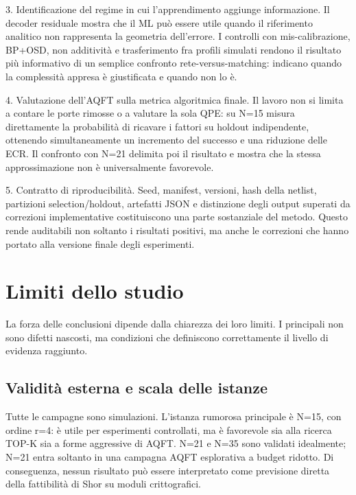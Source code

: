 3. Identificazione del regime in cui l'apprendimento aggiunge informazione. Il decoder residuale mostra che il ML può essere utile quando il riferimento analitico non rappresenta la geometria dell'errore. I controlli con mis-calibrazione, BP+OSD, non additività e trasferimento fra profili simulati rendono il risultato più informativo di un semplice confronto rete-versus-matching: indicano quando la complessità appresa è giustificata e quando non lo è.

4. Valutazione dell'AQFT sulla metrica algoritmica finale. Il lavoro non si limita a contare le porte rimosse o a valutare la sola QPE: su N=15 misura direttamente la probabilità di ricavare i fattori su holdout indipendente, ottenendo simultaneamente un incremento del successo e una riduzione delle ECR. Il confronto con N=21 delimita poi il risultato e mostra che la stessa approssimazione non è universalmente favorevole.

5. Contratto di riproducibilità. Seed, manifest, versioni, hash della netlist, partizioni selection/holdout, artefatti JSON e distinzione degli output superati da correzioni implementative costituiscono una parte sostanziale del metodo. Questo rende auditabili non soltanto i risultati positivi, ma anche le correzioni che hanno portato alla versione finale degli esperimenti.

\section{Limiti dello studio}\label{sec:finale_6_3}

La forza delle conclusioni dipende dalla chiarezza dei loro limiti. I principali non sono difetti nascosti, ma condizioni che definiscono correttamente il livello di evidenza raggiunto.

\subsection{Validità esterna e scala delle istanze}\label{sec:finale_6_3_1}

Tutte le campagne sono simulazioni. L'istanza rumorosa principale è N=15, con ordine r=4: è utile per esperimenti controllati, ma è favorevole sia alla ricerca TOP-K sia a forme aggressive di AQFT. N=21 e N=35 sono validati idealmente; N=21 entra soltanto in una campagna AQFT esplorativa a budget ridotto. Di conseguenza, nessun risultato può essere interpretato come previsione diretta della fattibilità di Shor su moduli crittografici.

